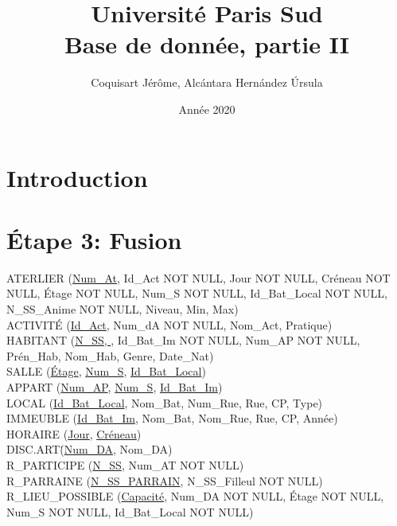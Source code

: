 \documentclass[a4paper,10.5pt]{report}
\title{\textbf{\Huge  Université Paris Sud}\\ Base de donnée, partie II}
\author{Coquisart Jérôme, Alcántara Hernández Úrsula}
\date{Année 2020}
\begin{document}
    \maketitle
    \newpage
    \newpage

    \section*{Introduction}
    \section{Étape 3: Fusion}

	ATERLIER (\underline{Num\_At}, Id\_Act NOT NULL, Jour NOT NULL, Créneau NOT NULL, Étage NOT NULL, Num\_S NOT NULL, Id\_Bat\_Local NOT NULL, N\_SS\_Anime NOT NULL, Niveau, Min, Max) \\

	ACTIVITÉ (\underline{Id\_Act}, Num\_dA NOT NULL, Nom\_Act, Pratique) \\

	HABITANT (\underline{N\_SS, }, Id\_Bat\_Im NOT NULL, Num\_AP NOT NULL, Prén\_Hab, Nom\_Hab, Genre, Date\_Nat)  \\

	SALLE (\underline{Étage}, \underline{Num\_S}, \underline{Id\_Bat\_Local}) \\

	APPART (\underline{Num\_AP}, \underline{Num\_S}, \underline{Id\_Bat\_Im}) \\

	LOCAL (\underline{Id\_Bat\_Local}, Nom\_Bat, Num\_Rue, Rue, CP, Type) \\

	IMMEUBLE (\underline{Id\_Bat\_Im}, Nom\_Bat, Nom\_Rue, Rue, CP, Année) \\

	HORAIRE (\underline{Jour}, \underline{Créneau}) \\

	DISC.ART\. (\underline{Num\_DA}, Nom\_DA) \\

	R\_PARTICIPE (\underline{N\_SS}, Num\_AT NOT NULL) \\

	R\_PARRAINE (\underline{N\_SS\_PARRAIN}, N\_SS\_Filleul NOT NULL) \\

	R\_LIEU\_POSSIBLE (\underline{Capacité}, Num\_DA NOT NULL, Étage NOT NULL, Num\_S NOT NULL, Id\_Bat\_Local NOT NULL) \\
\end{document}
